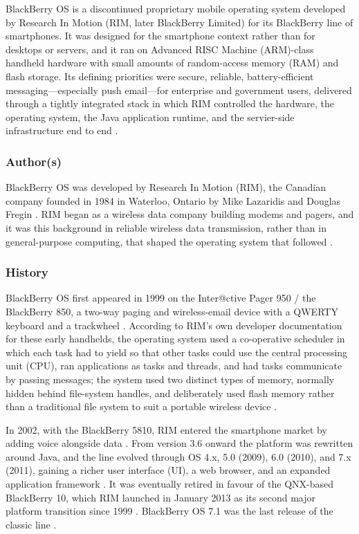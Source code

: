 BlackBerry OS is a discontinued proprietary mobile operating system
developed by Research In Motion (RIM, later BlackBerry Limited) for its
BlackBerry line of smartphones. It was designed for the smartphone
context rather than for desktops or servers, and it ran on
Advanced RISC Machine (ARM)-class handheld hardware with small amounts of
random-access memory (RAM) and flash storage.
Its defining priorities were secure, reliable, battery-efficient
messaging---especially push email---for enterprise and government users,
delivered through a tightly integrated stack in which RIM controlled the
hardware, the operating system, the Java application runtime, and the
servier-side infrastructure end to end \citep{historytools2024}.

\subsubsection{Author(s)}
BlackBerry OS was developed by Research In Motion (RIM), the Canadian
company founded in 1984  in Waterloo, Ontario by Mike Lazaridis and
Douglas Fregin \citep{historytools2024}. RIM began as a wireless
data company building modems and pagers, and it was this background in
reliable wireless data transmission, rather than in general-purpose
computing, that shaped the operating system that followed
\citep{historytools2024}.

\subsubsection{History}
BlackBerry OS first appeared in 1999 on the Inter@ctive Pager 950 / the
BlackBerry 850, a two-way paging and wireless-email device with a QWERTY
keyboard and a trackwheel \citep{historytools2024}. According to
RIM's own developer documentation for these early handhelds, the
operating system used a co-operative scheduler in which each task had to
yield so that other tasks could use the central processing unit (CPU), ran
applications as tasks
and threads, and had tasks communicate by passing messages; the system
used two distinct types of memory, normally hidden behind file-system
handles, and deliberately used flash memory rather than a traditional
file system to suit a portable wireless device \citep{rim950manual}.

In 2002, with the BlackBerry 5810, RIM entered the smartphone market by
adding voice alongside data \citep{historytools2024}. From version
3.6 onward the platform was rewritten around Java, and the line evolved
through OS 4.x, 5.0 (2009), 6.0 (2010), and 7.x (2011), gaining a richer
user interface (UI), a web browser, and an expanded application framework
\citep{phonemore_bbos, reincubate_bb71}. It was eventually retired
in favour of the QNX-based BlackBerry 10, which RIM launched in January
2013 as its second major platform transition since 1999
\citep{crackberry_qnxhistory, osorg2023}. BlackBerry OS 7.1 was the
last release of the classic line \citep{phonemore_bbos,
  reincubate_bb71}.

